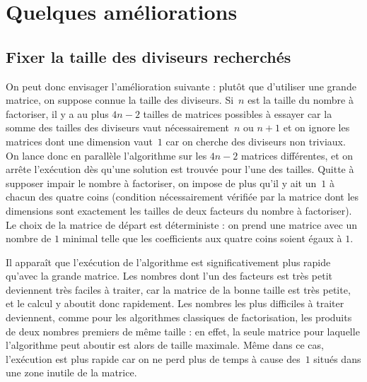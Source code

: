 \section{Quelques améliorations}

\subsection{Fixer la taille des diviseurs recherchés}

On  peut donc  envisager l'amélioration  suivante  : plutôt  que d'utiliser  une
grande matrice, on suppose connue la  taille des diviseurs. Si~$n$ est la taille
du nombre à  factoriser, il y a  au plus $4n-2$ tailles de  matrices possibles à
essayer car la somme des  tailles des diviseurs vaut nécessairement~$n$ ou $n+1$
et  on ignore  les  matrices dont  une  dimension vaut~$1$  car  on cherche  des
diviseurs non triviaux. On  lance donc en parallèle l'algorithme  sur les $4n-2$
matrices différentes, et  on arrête l'exécution dès qu'une  solution est trouvée
pour l'une  des tailles.  Quitte  à supposer impair  le nombre à  factoriser, on
impose  de  plus  qu'il y  ait  un~$1$  à  chacun  des quatre  coins  (condition
nécessairement vérifiée par  la matrice dont les dimensions  sont exactement les
tailles de deux facteurs du nombre à factoriser). Le choix de la matrice de départ est déterministe : on prend une matrice avec un nombre de $1$ minimal telle que les coefficients aux quatre coins soient égaux à $1$.

Il apparaît  que l'exécution de  l'algorithme est significativement  plus rapide
qu'avec la  grande matrice. Les  nombres dont l'un  des facteurs est  très petit
deviennent très  faciles à traiter, car la  matrice de la bonne  taille est très
petite, et le calcul y aboutit  donc rapidement. Les nombres les plus difficiles
à traiter  deviennent, comme pour  les algorithmes classiques  de factorisation,
les  produits de  deux nombres  premiers de  même taille  : en  effet,  la seule
matrice   pour  laquelle  l'algorithme   peut  aboutir   est  alors   de  taille
maximale. Même dans ce  cas, l'exécution est plus rapide car on  ne perd plus de
temps à cause des~$1$ situés dans une zone inutile de la
matrice. %

